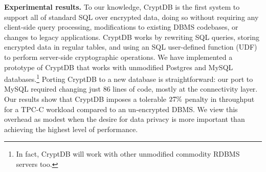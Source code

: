 
{\bf Experimental results.}  To our knowledge, CryptDB is the first
system to support all of standard SQL over encrypted data, doing so
without requiring any client-side query processing, modifications to
existing DBMS codebases, or changes to legacy applications.  CryptDB
works by rewriting SQL queries, storing encrypted data in regular
tables, and using an SQL user-defined function (UDF) to perform
server-side cryptographic operations.  We have implemented a prototype
of CryptDB that works with unmodified Postgres and MySQL
databases.\footnote{In fact, CryptDB will work with other unmodified
  commodity RDBMS servers too.}  Porting CryptDB to a new database is
straightforward: our port to MySQL required changing just $86$ lines
of code, mostly at the connectivity layer.  Our results show that
CryptDB imposes a tolerable $27\%$ penalty in throughput for a TPC-C
workload compared to an un-encrypted DBMS\@.  We view this overhead as
modest when the desire for data privacy is more important than
achieving the highest level of performance.
